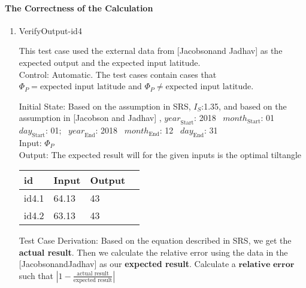 \documentclass[12pt, titlepage]{article}
\begin{document}
\paragraph{The Correctness of the Calculation}\label{tP_CC}
\begin{enumerate}


\item{VerifyOutput-id4\\} 

This test case used the external data from [Jacobsonand
Jadhav] \cite{JacobsonandJadhav} as the expected output and the expected
input latitude.\\ 

Control: Automatic. The test cases contain cases that $\Phi_P
= \text{expected input latitude}$ and $\Phi_P \ne \text{expected input
latitude}$. 

Initial State: Based on the assumption in SRS\cite{YS2019}, $I_{S}$:1.35, and
based on the assumption in [Jacobson and Jadhav] \cite{JacobsonandJadhav},
$\mathit{year}_\text{Start}$: 2018
~$\mathit{month}_\text{Start}$: 01 
~$\mathit{day}_\text{Start}$: 01;
~$\mathit{year}_\text{End}$: 2018 
~$\mathit{month}_\text{End}$: 12
~$\mathit{day}_\text{End}$: 31\\ 

Input: $\Phi_P$\\

Output: The expected result will for the given inputs is the optimal tiltangle


\noindent \begin{tabular}{l l l l} 
    \toprule		
    \textbf{id} & \textbf{Input} & \textbf{Output}\\ 
	\midrule
   id4.1 &  64.13 & 43\\
   id4.2 &  63.13 & 43\\
    \bottomrule
  \end{tabular}


Test Case Derivation: Based on the equation described in SRS\cite{YS2019}, we
get the \textbf{actual result}. Then we calculate the relative error using the
data in the
 [JacobsonandJadhav]\cite{JacobsonandJadhav} as our \textbf{expected result}. 
Calculate a $\textbf{relative error}$ such that $| 1 - \frac{\text{actual result}}{ \text{expected result}} |$ 



\end{enumerate}
\end{document}
